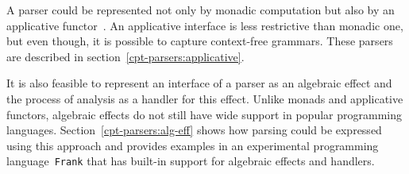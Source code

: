 A parser could be represented not only by monadic computation but also by an
applicative functor~\cite{Mcbride:2008:APE:1348940.1348941}. An applicative interface
is less restrictive than monadic one, but even though, it is possible to capture
context-free grammars. These parsers are described in
section~\ref{cpt-parsers:applicative}.

It is also feasible to represent an interface of a parser as an algebraic effect and
the process of analysis as a handler for this effect. Unlike monads and applicative functors,
algebraic effects do not still have wide support in popular programming languages.
Section~\ref{cpt-parsers:alg-eff} shows how parsing could be expressed using this
approach and provides examples in an experimental programming language~\texttt{Frank}
that has built-in support for algebraic effects and handlers.